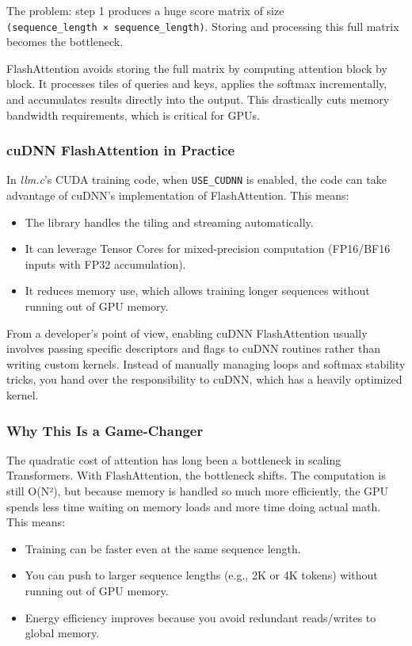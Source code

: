\documentclass[
  letterpaper,
  DIV=11,
  numbers=noendperiod]{scrreprt}
\providecommand{\tightlist}{%
  \setlength{\itemsep}{0pt}\setlength{\parskip}{0pt}}
\begin{document}
The problem: step 1 produces a huge score matrix of size
\texttt{(sequence\_length\ ×\ sequence\_length)}. Storing and processing
this full matrix becomes the bottleneck.

FlashAttention avoids storing the full matrix by computing attention
block by block. It processes tiles of queries and keys, applies the
softmax incrementally, and accumulates results directly into the output.
This drastically cuts memory bandwidth requirements, which is critical
for GPUs.

\subsubsection{cuDNN FlashAttention in
Practice}\label{cudnn-flashattention-in-practice}

In \emph{llm.c}'s CUDA training code, when \texttt{USE\_CUDNN} is
enabled, the code can take advantage of cuDNN's implementation of
FlashAttention. This means:

\begin{itemize}
\tightlist
\item
  The library handles the tiling and streaming automatically.
\item
  It can leverage Tensor Cores for mixed-precision computation
  (FP16/BF16 inputs with FP32 accumulation).
\item
  It reduces memory use, which allows training longer sequences without
  running out of GPU memory.
\end{itemize}

From a developer's point of view, enabling cuDNN FlashAttention usually
involves passing specific descriptors and flags to cuDNN routines rather
than writing custom kernels. Instead of manually managing loops and
softmax stability tricks, you hand over the responsibility to cuDNN,
which has a heavily optimized kernel.

\subsubsection{Why This Is a
Game-Changer}\label{why-this-is-a-game-changer}

The quadratic cost of attention has long been a bottleneck in scaling
Transformers. With FlashAttention, the bottleneck shifts. The
computation is still O(N²), but because memory is handled so much more
efficiently, the GPU spends less time waiting on memory loads and more
time doing actual math. This means:

\begin{itemize}
\tightlist
\item
  Training can be faster even at the same sequence length.
\item
  You can push to larger sequence lengths (e.g., 2K or 4K tokens)
  without running out of GPU memory.
\item
  Energy efficiency improves because you avoid redundant reads/writes to
  global memory.
\end{itemize}
\end{document}
